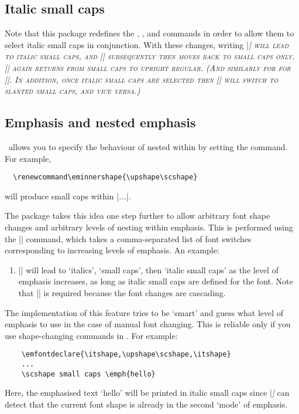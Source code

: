 \subsection{Italic small caps}

\DescribeMacro{\itshape}
\DescribeMacro{\slshape}
\DescribeMacro{\scshape}
Note that this package redefines the , , and  commands in order to allow them to select italic small caps in conjunction.
With these changes, writing |\itshape\scshape| will lead to italic small caps, and |\upshape| subsequently then moves back to small caps only. |\upshape| again returns from small caps to upright regular.
(And similarly for for |\slshape|. In addition, once italic small caps are selected then |\slshape| will switch to slanted small caps, and vice versa.)


\subsection{Emphasis and nested emphasis}

\DescribeMacro{\eminnershape}
\LaTeXe\ allows you to specify the behaviour of  nested within  by setting the  command.
For example,
\begin{Verbatim}
  \renewcommand\eminnershape{\upshape\scshape}
\end{Verbatim}
will produce small caps within |\emph{\emph{...}}|.

\DescribeMacro{\emfontdeclare}
The  package takes this idea one step further to allow arbitrary font shape changes and arbitrary levels of nesting within emphasis.
This is performed using the |\emfontdeclare| command, which takes a comma-separated list of font switches corresponding to increasing levels of emphasis.
An example:
\begin{enumerate}
\item |\emfontdeclare{\itshape,\upshape\scshape,\itshape}| will lead to `italics', `small caps', then `italic small caps' as the level of emphasis increases, as long as italic small caps are defined for the font.
  Note that |\upshape| is required because the font changes are cascading.
\end{enumerate}
The implementation of this feature tries to be `smart' and guess what level of emphasis to use in the case of manual font changing.
This is reliable only if you use shape-changing commands in .
For example:
\begin{Verbatim}
    \emfontdeclare{\itshape,\upshape\scshape,\itshape}
    ...
    \scshape small caps \emph{hello}
\end{Verbatim}
Here, the emphasised text `hello' will be printed in italic small caps since |\emph| can detect that the current font shape is already in the second `mode' of emphasis.

